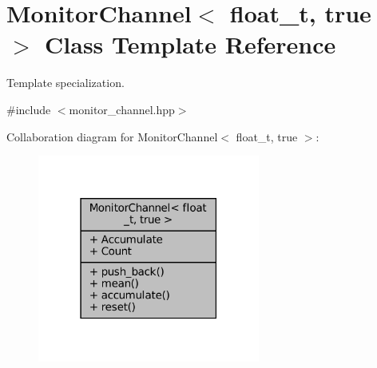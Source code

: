 \hypertarget{classMonitorChannel_3_01float__t_00_01true_01_4}{}\section{Monitor\+Channel$<$ float\+\_\+t, true $>$ Class Template Reference}
\label{classMonitorChannel_3_01float__t_00_01true_01_4}


Template specialization.  




{\ttfamily \#include $<$monitor\+\_\+channel.\+hpp$>$}



Collaboration diagram for Monitor\+Channel$<$ float\+\_\+t, true $>$\+:\nopagebreak
\begin{figure}[H]
\begin{center}
\leavevmode
\includegraphics[width=207pt]{d1/d6e/classMonitorChannel_3_01float__t_00_01true_01_4__coll__graph}
\end{center}
\end{figure}
